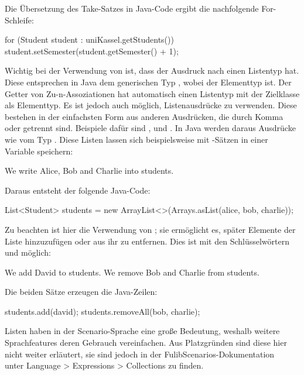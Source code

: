 Die Übersetzung des Take-Satzes in Java-Code ergibt die nachfolgende For-Schleife:

\begin{jcodeblock}
    for (Student student : uniKassel.getStudents()) {
        student.setSemester(student.getSemester() + 1);
    }
\end{jcodeblock}

Wichtig bei der Verwendung von  ist, dass der Ausdruck nach  einen Listentyp hat.
Diese entsprechen in Java dem generischen Typ , wobei  der Elementtyp ist.
Der Getter von Zu-n-Assoziationen hat automatisch einen Listentyp mit der Zielklasse als Elementtyp.
Es ist jedoch auch möglich, Listenausdrücke zu verwenden.
Diese bestehen in der einfachsten Form aus anderen Ausdrücken, die durch Komma oder  getrennt sind.
Beispiele dafür sind ,  und .
In Java werden daraus Ausdrücke wie  vom Typ .
Diese Listen lassen sich beispielsweise mit -Sätzen in einer Variable speichern:

\begin{codeblock}
    We write Alice, Bob and Charlie into students.
\end{codeblock}

Daraus entsteht der folgende Java-Code:

\begin{jcodeblock}
    List<Student> students = new ArrayList<>(Arrays.asList(alice, bob, charlie));
\end{jcodeblock}

Zu beachten ist hier die Verwendung von ;
sie ermöglicht es, später Elemente der Liste hinzuzufügen oder aus ihr zu entfernen.
Dies ist mit den Schlüsselwörtern  und  möglich:

\begin{codeblock}
    We add David to students.
    We remove Bob and Charlie from students.
\end{codeblock}

Die beiden Sätze erzeugen die Java-Zeilen:

\begin{jcodeblock}
    students.add(david);
    students.removeAll(bob, charlie);
\end{jcodeblock}

Listen haben in der Scenario-Sprache eine große Bedeutung, weshalb weitere Sprachfeatures deren Gebrauch vereinfachen.
Aus Platzgründen sind diese hier nicht weiter erläutert, sie sind jedoch in der FulibScenarios-Dokumentation~\cite{documentation} unter Language > Expressions > Collections zu finden.

